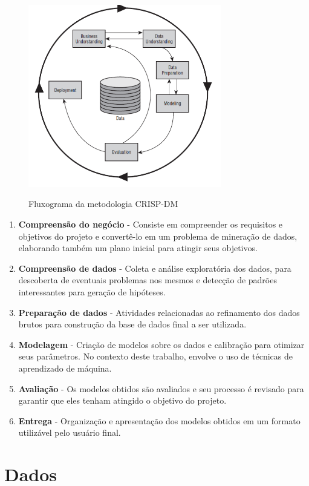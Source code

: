 \documentclass[ppgc,pep]{iiufrgs}
\begin{document}
\begin{figure}[h]
	\caption{Fluxograma da metodologia CRISP-DM}
	\centering
	\includegraphics[width=0.75\textwidth]{crispdm}
	\label{crisp-dm}
\end{figure}

\begin{enumerate}
	\item \textbf{Compreensão do negócio} - Consiste em compreender os requisitos e objetivos do projeto e convertê-lo em um problema de mineração de dados, elaborando também um plano inicial para atingir seus objetivos.
	\item \textbf{Compreensão de dados} - Coleta e análise exploratória dos dados, para descoberta de eventuais problemas nos mesmos e detecção de padrões interessantes para geração de hipóteses.
	\item \textbf{Preparação de dados} - Atividades relacionadas ao refinamento dos dados brutos para construção da base de dados final a ser utilizada.
	\item \textbf{Modelagem} - Criação de modelos sobre os dados e calibração para otimizar seus parâmetros. No contexto deste trabalho, envolve o uso de técnicas de aprendizado de máquina.
	\item \textbf{Avaliação} - Os modelos obtidos são avaliados e seu processo é revisado para garantir que eles tenham atingido o objetivo do projeto.
	\item \textbf{Entrega} - Organização e apresentação dos modelos obtidos em um formato utilizável pelo usuário final.
\end{enumerate}

\section{Dados}
\end{document}

